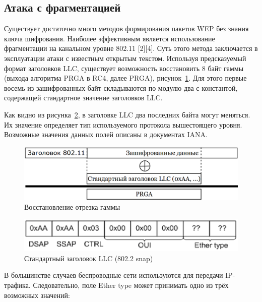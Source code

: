\subsection{Атака с фрагментацией}

Существует достаточно много методов формирования пакетов WEP без знания ключа
шифрования. Наиболее эффективным является использование фрагментации на
канальном уровне 802.11 [2][4]. Суть этого метода заключается в эксплуатации атаки с
известным открытым текстом. Используя предсказуемый формат заголовков LLC,
существует возможность восстановить 8 байт гаммы (выхода алгоритма PRGA в RC4,
далее PRGA), рисунок~\ref{fig:restore_part_of_gamma}. Для этого первые восемь из
зашифрованных байт складываются по модулю два с константой, содержащей
стандартное значение заголовков LLC.


Как видно из рисунка~\ref{fig:default_llc_header}, в заголовке LLC два последних байта могут меняться. Их
значение определяет тип используемого протокола вышестоящего уровня. Возможные
значения данных полей описаны в документах IANA.

\begin{figure}
    \includegraphics[width=1\textwidth]{graphics/restore_part_of_gamma.eps}
    \caption{Восстановление отрезка гаммы}
    \label{fig:restore_part_of_gamma}
\end{figure}

\begin{figure}
    \includegraphics[width=1\textwidth]{graphics/default_llc_header.eps}
    \caption{Стандартный заголовок LLC (802.2 snap)}
    \label{fig:default_llc_header}
\end{figure}

В большинстве случаев беспроводные сети используются для передачи IP-трафика.
Следовательно, поле Ether type может принимать одно из трёх возможных значений:


